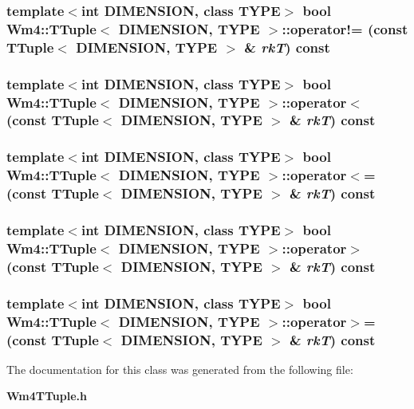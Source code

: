 \subsubsection{\setlength{\rightskip}{0pt plus 5cm}template$<$int DIMENSION, class TYPE$>$ bool {\bf Wm4::TTuple}$<$ DIMENSION, TYPE $>$::operator!= (const {\bf TTuple}$<$ DIMENSION, TYPE $>$ \& {\em rk\-T}) const}\label{classWm4_1_1TTuple_1c0a98b2e5a44e2d6ed7fa51de8381af}


\subsubsection{\setlength{\rightskip}{0pt plus 5cm}template$<$int DIMENSION, class TYPE$>$ bool {\bf Wm4::TTuple}$<$ DIMENSION, TYPE $>$::operator$<$ (const {\bf TTuple}$<$ DIMENSION, TYPE $>$ \& {\em rk\-T}) const}\label{classWm4_1_1TTuple_9fbc4e18f280382e7107140697bb9025}


\subsubsection{\setlength{\rightskip}{0pt plus 5cm}template$<$int DIMENSION, class TYPE$>$ bool {\bf Wm4::TTuple}$<$ DIMENSION, TYPE $>$::operator$<$= (const {\bf TTuple}$<$ DIMENSION, TYPE $>$ \& {\em rk\-T}) const}\label{classWm4_1_1TTuple_86419d1d2e2fceacc6b47beae87f3919}


\subsubsection{\setlength{\rightskip}{0pt plus 5cm}template$<$int DIMENSION, class TYPE$>$ bool {\bf Wm4::TTuple}$<$ DIMENSION, TYPE $>$::operator$>$ (const {\bf TTuple}$<$ DIMENSION, TYPE $>$ \& {\em rk\-T}) const}\label{classWm4_1_1TTuple_0242a0b4520f71efc7019f0f4be11962}


\subsubsection{\setlength{\rightskip}{0pt plus 5cm}template$<$int DIMENSION, class TYPE$>$ bool {\bf Wm4::TTuple}$<$ DIMENSION, TYPE $>$::operator$>$= (const {\bf TTuple}$<$ DIMENSION, TYPE $>$ \& {\em rk\-T}) const}\label{classWm4_1_1TTuple_2c95a38aa11afcc29f7bbc94c20de9e1}




The documentation for this class was generated from the following file:\begin{CompactItemize}
\item 
{\bf Wm4TTuple.h}\end{CompactItemize}
